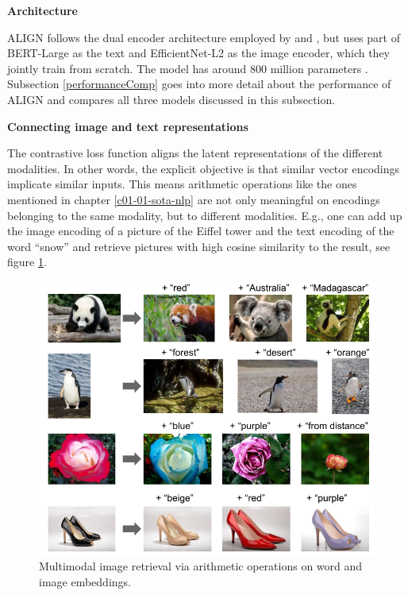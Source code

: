 \documentclass[
]{krantz}
\begin{document}
\textbf{Architecture}

ALIGN follows the dual encoder architecture employed by \citet{zhang2020contrastive} and \citet{radford2021learning}, but uses part of BERT-Large as the text and EfficientNet-L2 as the image encoder, which they jointly train from scratch.
The model has around 800 million parameters \citep{alford2021alignparams}.
Subsection \ref{performanceComp} goes into more detail about the performance of ALIGN and compares all three models discussed in this subsection.

\textbf{Connecting image and text representations}

The contrastive loss function aligns the latent representations of the different modalities.
In other words, the explicit objective is that similar vector encodings implicate similar inputs.
This means arithmetic operations like the ones mentioned in chapter \ref{c01-01-sota-nlp} are not only meaningful on encodings belonging to the same modality, but to different modalities.
E.g., one can add up the image encoding of a picture of the Eiffel tower and the text encoding of the word ``snow'' and retrieve pictures with high cosine similarity to the result, see figure \ref{fig:img-txt-addition}.

\begin{figure}

{\centering \includegraphics[width=1\linewidth]{figures/02-04-text-support-img/align-word-and-image-addition} 

}

\caption{Multimodal image retrieval via arithmetic operations on word and image embeddings.}\label{fig:img-txt-addition}
\end{figure}
\end{document}
